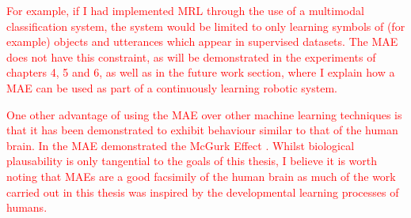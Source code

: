 \textcolor{red}{For example, if I had implemented \ac{MRL} through the use of a multimodal classification system, the system would be limited to only learning symbols of (for example) objects and utterances which appear in supervised datasets. The \ac{MAE} does not have this constraint, as will be demonstrated in the experiments of chapters 4, 5 and 6, as well as in the future work section, where I explain how a \ac{MAE} can be used as part of a continuously learning robotic system.}

\textcolor{red}{One other advantage of using the \ac{MAE} over other machine learning techniques is that it has been demonstrated to exhibit behaviour similar to that of the human brain. In \cite{ngiam2011multimodal} the \ac{MAE} demonstrated the McGurk Effect \cite{mcgurk1976hearing}. Whilst biological plausability is only tangential to the goals of this thesis, I believe it is worth noting that \acp{MAE} are a good facsimily of the human brain as much of the work carried out in this thesis was inspired by the developmental learning processes of humans.}

%
%
%


